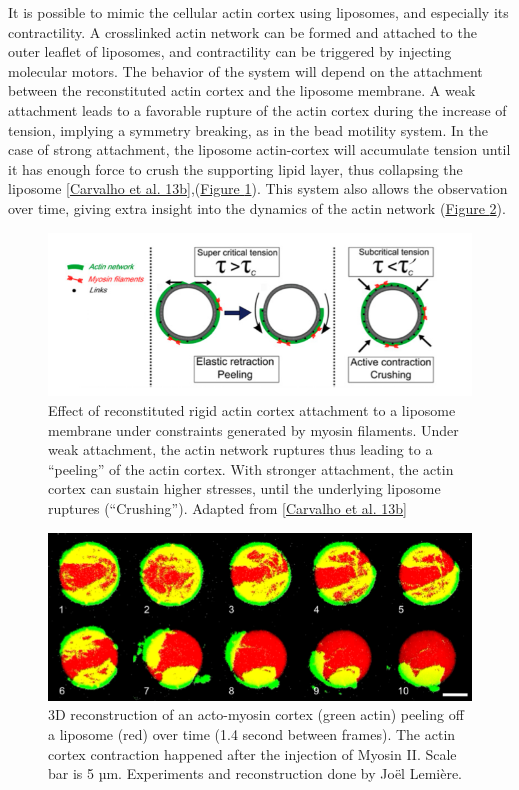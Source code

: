 \documentclass[A4paperpaper,11pt,english]{sphinxmanual}
\begin{document}
It is possible to mimic the cellular actin cortex using liposomes, and especially
its contractility. A crosslinked actin network can be formed and attached to
the outer leaflet of liposomes, and contractility can be triggered by injecting
molecular motors. The behavior of the system will depend on the attachment
between the reconstituted actin cortex and the liposome membrane.  A weak attachment
leads to a favorable rupture of the actin cortex during the increase of tension,
implying a symmetry breaking, as in the bead motility system.  In the case of strong
attachment, the liposome actin-cortex will accumulate tension until it has
enough force to crush the supporting lipid layer, thus collapsing the liposome
{\hyperref[index-latex:carvalho2013]{{[}Carvalho et al. 13b{]}}},(\hyperref[index-latex:fig-peeling-scheme]{Figure  \ref*{index-latex:fig-peeling-scheme}}). This system also allows the observation
over time, giving extra insight into the dynamics of the actin network (\hyperref[index-latex:fig-peeling-3d]{Figure  \ref*{index-latex:fig-peeling-3d}}).
\begin{figure}[htbp]
\centering
\capstart

\includegraphics[width=0.800\linewidth]{joel-2-11.png}
\caption{Effect of reconstituted rigid actin cortex attachment to a liposome
membrane under constraints generated by myosin filaments. Under weak attachment,
the actin network ruptures thus leading to a ``peeling'' of the actin cortex.
With stronger attachment, the actin cortex can sustain higher stresses, until
the underlying liposome ruptures (``Crushing''). Adapted from
{\hyperref[index-latex:carvalho2013]{{[}Carvalho et al. 13b{]}}}}\label{index-latex:fig-peeling-scheme}\end{figure}
\begin{figure}[htbp]
\centering
\capstart

\includegraphics[width=0.900\linewidth]{joel-5-12.png}
\caption{3D reconstruction of an acto-myosin cortex (green actin) peeling off a
liposome (red) over time (1.4 second between frames). The actin cortex
contraction happened after the injection of Myosin II. Scale bar is 5 µm.
Experiments and reconstruction done by Joël Lemière.}\label{index-latex:fig-peeling-3d}\end{figure}
\end{document}
